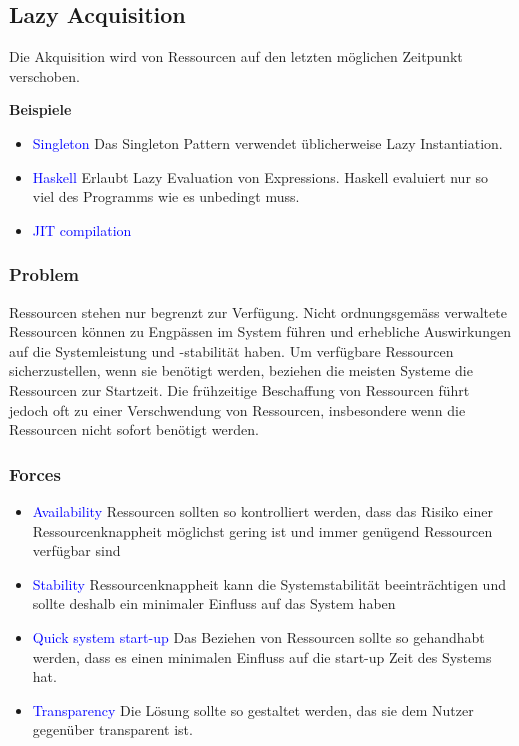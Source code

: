 \subsection{Lazy Acquisition}

Die Akquisition wird von Ressourcen auf den letzten möglichen Zeitpunkt verschoben.

\textbf{Beispiele}

\begin{itemize}
    \item \textcolor{blue}{Singleton} Das Singleton Pattern verwendet üblicherweise Lazy Instantiation.
    \item \textcolor{blue}{Haskell} Erlaubt Lazy Evaluation von Expressions. Haskell evaluiert nur so viel des Programms wie es unbedingt muss.
    \item \textcolor{blue}{JIT compilation}
\end{itemize}

\subsubsection{Problem}

Ressourcen stehen nur begrenzt zur Verfügung. Nicht ordnungsgemäss verwaltete Ressourcen können zu Engpässen im System führen und erhebliche Auswirkungen auf die Systemleistung und -stabilität haben. Um verfügbare Ressourcen sicherzustellen, wenn sie benötigt werden, beziehen die meisten Systeme die Ressourcen zur Startzeit. Die frühzeitige Beschaffung von Ressourcen führt jedoch oft zu einer Verschwendung von Ressourcen, insbesondere wenn die Ressourcen nicht sofort benötigt werden.

\subsubsection{Forces}

\begin{itemize}
    \item \textcolor{blue}{Availability} Ressourcen sollten so kontrolliert werden, dass das Risiko einer Ressourcenknappheit möglichst gering ist und immer genügend Ressourcen verfügbar sind
    \item \textcolor{blue}{Stability} Ressourcenknappheit kann die Systemstabilität beeinträchtigen und sollte deshalb ein minimaler Einfluss auf das System haben
    \item \textcolor{blue}{Quick system start-up} Das Beziehen von Ressourcen sollte so gehandhabt werden, dass es einen minimalen Einfluss auf die start-up Zeit des Systems hat.
    \item \textcolor{blue}{Transparency} Die Lösung sollte so gestaltet werden, das sie dem Nutzer gegenüber transparent ist.
\end{itemize}

